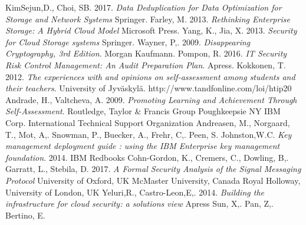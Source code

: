 \documentclass{article}
\begin{document}
\begin{desctiption}
\begin{thebibliography}{9}
        KimSejun,D.,
        Choi, SB.
        2017.
	\textit{Data Deduplication for Data Optimization for Storage and Network Systems}
        Springer.
        Farley, M.
        2013.
	\textit{Rethinking Enterprise Storage: A Hybrid Cloud Model}
        Microsoft Press.
        Yang, K.,
	Jia, X.
        2013.
	\textit{Security for Cloud Storage systems}
        Springer.
        Wayner, P,.
        2009.
	\textit{Disappearing Cryptography, 3rd Edition}.
        Morgan Kaufmann.
        Pompon, R.
        2016.
        \textit{IT Security Risk Control Management: An Audit Preparation Plan}.
	Apress.
        Kokkonen, T.
        2012.
        \textit{The experiences with and opinions on self-assessment among students and their teachers}.
	University of Jyväskylä.
        http://www.tandfonline.com/loi/htip20
        Andrade, H.,
        Valtcheva, A.
	2009.
	\textit{Promoting Learning and Achievement Through Self-Assessment}.
	Routledge, Taylor \& Francis Group
        Poughkeepsie NY IBM Corp. International Technical Support Organization
        Andreasen, M.,
        Norgaard, T.,
        Mot, A,.
        Snowman, P.,
        Buecker, A.,
        Frehr, C,.
        Peen, S.
        Johnston,W.C.
	\textit{Key management deployment guide : using the IBM Enterprise key management foundation}.
        2014.
	IBM Redbooks
        Cohn-Gordon, K.,
        Cremers, C.,
        Dowling, B,.
        Garratt, L.,
        Stebila, D.
        2017.
        \textit{A Formal Security Analysis of the Signal Messaging Protocol}
	University of Oxford, UK
        McMaster University, Canada
        Royal Holloway, University of London, UK
        Yeluri,R.,
        Castro-Leon,E,.
        2014.
	\textit{Building the infrastructure for cloud security: a solutions view}
        Apress
        Sun, X,.
        Pan, Z,.
        Bertino, E.

\end{thebibliography}
\end{desctiption}
\end{document}
